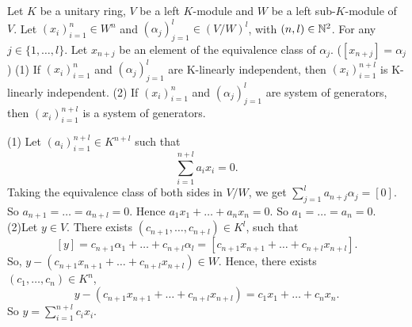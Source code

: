 \begin{theoremenv}\label{6.10.5}
    Let $K$ be a unitary ring, $V$ be a left $K$-module  and $W$ be a left sub-$K$-module of $V$. Let $(x_i)_{i=1}^{n}\in W^n$ and $\left(\alpha_j\right)_{j=1}^l\in \left(V/W\right)^l$, with $(n,l)\in \mathbb{N}^2$. For any $j\in \{1,\dots,l\}$. Let $x_{n+j}$ be an element of the equivalence class of $\alpha_j$. ($[x_{n+j}]=\alpha_j$)
    \newline
    (1) If $(x_i)_{i=1}^n$ and $(\alpha_j)_{j=1}^l$ are K-linearly independent, then $(x_i)_{i=1}^{n+l}$ is K-linearly independent.
    \newline
    (2) If $(x_i)_{i=1}^{n}$ and $(\alpha_j)_{j=1}^l$ are system of generators, then $(x_i)_{i=1}^{n+l}$ is a system of generators. 
\end{theoremenv}
\begin{proofenv}
    \quad\newline
    (1) Let $(a_i)_{i=1}^{n+l}\in K^{n+l}$ such that 
    $$\sum_{i=1}^{n+l}a_ix_i=0.$$
    Taking the equivalence class of both sides in $V/W$, we get $\displaystyle \sum_{j=1}^{l}a_{n+j}\alpha_j=[0]$. So $a_{n+1}=\dots=a_{n+l}=0$. Hence $a_1x_1+\dots+a_nx_n=0$. So $a_1=\dots=a_n=0$.
    \newline
    (2)Let $y\in V$. There exists $(c_{n+1},\dots,c_{n+l})\in K^l$, such that 
    $$[y]=c_{n+1}\alpha_1+\dots +c_{n+l}\alpha_l=[c_{n+1}x_{n+1}+\dots+c_{n+l}x_{n+l}].$$
    So, $y-\left(c_{n+1}x_{n+1}+\dots+c_{n+l}x_{n+l}\right)\in W$. Hence, there exists $(c_1,\dots,c_n)\in K^n$,
    $$y-\left(c_{n+1}x_{n+1}+\dots+c_{n+l}x_{n+l}\right)=c_1x_1+\dots+c_nx_n.$$
    So $\displaystyle y= \sum_{i=1}^{n+l}c_ix_i$.
\end{proofenv}


